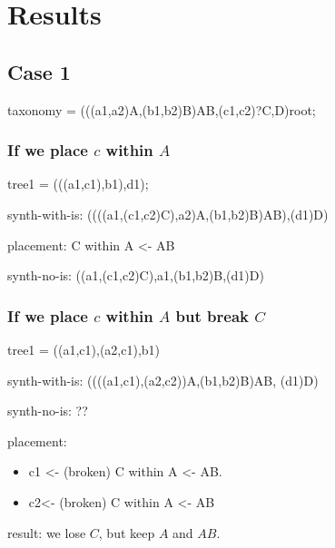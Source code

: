 \documentclass[english]{article}
\begin{document}

\section{Results}

\subsection{Case 1}

taxonomy = (((a1,a2)A,(b1,b2)B)AB,(c1,c2)?C,D)root;

\subsubsection{If we place $c$ within $A$}

tree1 = (((a1,c1),b1),d1);

synth-with-is: ((((a1,(c1,c2)C),a2)A,(b1,b2)B)AB),(d1)D)

placement: C within A <- AB

synth-no-is: ((a1,(c1,c2)C),a1,(b1,b2)B,(d1)D)

\subsubsection{If we place $c$ within $A$ but break $C$}

tree1 = ((a1,c1),(a2,c1),b1)

synth-with-is: ((((a1,c1),(a2,c2))A,(b1,b2)B)AB, (d1)D)

synth-no-is: ??

placement:  \begin{itemize} \item c1 <- (broken) C within A <- AB.
\item c2<- (broken) C within A <- AB \end{itemize} result: we lose
$C$, but keep $A$ and $AB$.
\end{document}
